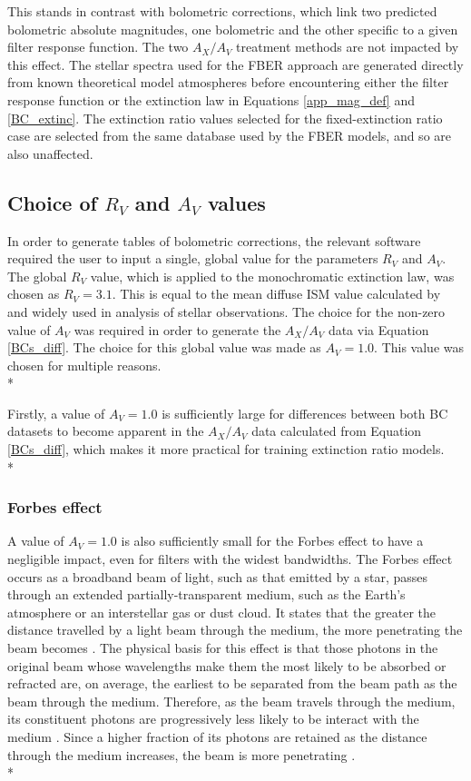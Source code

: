 \documentclass[12pt, a4paper]{report}
\begin{document}
This stands in contrast with bolometric corrections, which link two predicted bolometric absolute magnitudes, one bolometric and the other specific to a given filter response function. The two $A_{X}/A_{V}$ treatment methods are not impacted by this effect. The stellar spectra used for the FBER approach are generated directly from known theoretical model atmospheres before encountering either the filter response function or the \cite{1989ApJ...345..245C} extinction law in Equations \ref{app_mag_def} and \ref{BC_extinc}. The extinction ratio values selected for the fixed-extinction ratio case are selected from the same database used by the FBER models, and so are also unaffected.

\subsection{Choice of $R_{V}$ and $A_{V}$ values} \label{forbes}
In order to generate tables of bolometric corrections, the relevant software required the user to input a single, global value for the parameters $R_{V}$ and $A_{V}$. The global $R_{V}$ value, which is applied to the \cite{1989ApJ...345..245C} monochromatic extinction law, was chosen as $R_{V} = 3.1$. This is equal to the mean diffuse ISM value calculated by \cite{1985ApJ...288..618R} and widely used in analysis of stellar observations. The choice for the non-zero value of $A_{V}$ was required in order to generate the $A_{X}/A_{V}$ data via Equation \ref{BCs_diff}. The choice for this global value was made as $A_{V} = 1.0$. This value was chosen for multiple reasons.\\*

Firstly, a value of $A_{V} = 1.0$ is sufficiently large for differences between both BC datasets to become apparent in the $A_{X}/A_{V}$ data calculated from Equation \ref{BCs_diff}, which makes it more practical for training extinction ratio models.\\*

\subsubsection{Forbes effect}
A value of $A_{V} = 1.0$ is also sufficiently small for the Forbes effect to have a negligible impact, even for filters with the widest bandwidths. The Forbes effect occurs as a broadband beam of light, such as that emitted by a star, passes through an extended partially-transparent medium, such as the Earth's atmosphere or an interstellar gas or dust cloud. It states that the greater the distance travelled by a light beam through the medium, the more penetrating the beam becomes \citep{1842RSPT..132..225F}. The physical basis for this effect is that those photons in the original beam whose wavelengths make them the most likely to be absorbed or refracted are, on average, the earliest to be separated from the beam path as the beam through the medium. Therefore, as the beam travels through the medium, its constituent photons are progressively less likely to be interact with the medium \citep{1995A&AS..109..293G}. Since a higher fraction of its photons are retained as the distance through the medium increases, the beam is more penetrating \citep{OHVRIL1999305}.\\*
\end{document}
